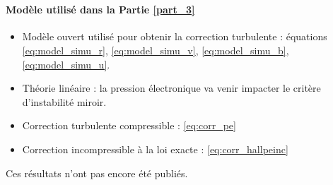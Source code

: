 {\begin{minipage}[c]{\linewidth}
\paragraph{\\Modèle utilisé dans la Partie \ref{part_3}} 
\begin{itemize}
\item Modèle ouvert utilisé pour obtenir la correction turbulente : équations \eqref{eq:model_simu_r},  \eqref{eq:model_simu_v}, \eqref{eq:model_simu_b}, \eqref{eq:model_simu_u}.
\item Théorie linéaire : la pression électronique va venir impacter le critère d'instabilité miroir.
\item Correction turbulente compressible : \eqref{eq:corr_pe}
\item Correction incompressible à la loi exacte  : \eqref{eq:corr_hallpeinc}
\end{itemize}
Ces résultats n'ont pas encore été publiés.
\end{minipage}}
